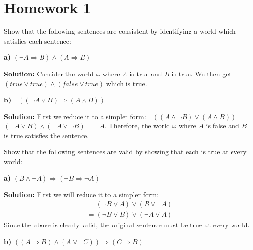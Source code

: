 \documentclass[11pt]{exam}
\begin{document}
\section{Homework 1}

\begin{questions}
\question[8] Show that the following sentences are consistent by identifying a world which satisfies
each sentence:
\vspace{1em}

\textbf{a) }$(\neg A \Rightarrow B) \land (A \Rightarrow B)$

\textbf{Solution:} Consider the world $\omega$ where $A$ is true and $B$ is true. We then get $(true \lor true) \land (false \lor true)$ which is true.
\vspace{1em}

\textbf{b) }$\neg((\neg A \lor B) \Rightarrow (A \land B))$

\textbf{Solution:} First we reduce it to a simpler form: $\neg((A \land \neg B) \lor (A \land B))$ = $(\neg A \lor B) \land (\neg A \lor \neg B)$ = $\neg A$. Therefore, the world $\omega$ where $A$ is false and $B$ is true satisfies the sentence.
\vspace{1em}

\question[8] Show that the following sentences are valid by showing that each is true at every world:
\vspace{1em}

\textbf{a)} $(B \land \neg A) \Rightarrow (\neg B \Rightarrow \neg A)$

\textbf{Solution:} First we will reduce it to a simpler form:
\begin{align*}
&= (\neg B \lor A) \lor (B \lor \neg A)\\
&= (\neg B \lor B) \lor (\neg A \lor A)
\end{align*}
Since the above is clearly valid, the original sentence must be true at every world.
\vspace{1em}

\textbf{b)} $((A \Rightarrow B) \land (A \lor \neg C)) \Rightarrow (C \Rightarrow B)$


\end{questions}
\end{document}
